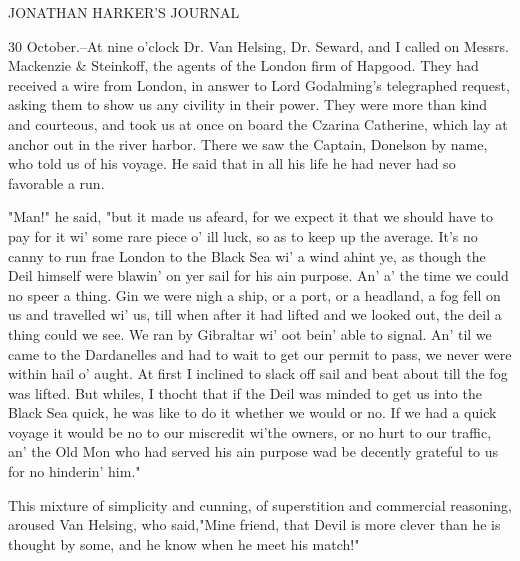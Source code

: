 JONATHAN HARKER'S JOURNAL 

30 October.--At nine o'clock Dr. Van Helsing, Dr. Seward, and I called on Messrs. Mackenzie & Steinkoff, the agents of the London firm of Hapgood. They had received a wire from London, in answer to Lord Godalming's telegraphed request, asking them to show us any civility in their power. They were more than kind and courteous, and took us at once on board the Czarina Catherine, which lay at anchor out in the river harbor. There we saw the Captain, Donelson by name, who told us of his voyage. He said that in all his life he had never had so favorable a run. 

"Man!" he said, "but it made us afeard, for we expect it that we should have to pay for it wi' some rare piece o' ill luck, so as to keep up the average. It's no canny to run frae London to the Black Sea wi' a wind ahint ye, as though the Deil himself were blawin' on yer sail for his ain purpose. An' a' the time we could no speer a thing. Gin we were nigh a ship, or a port, or a headland, a fog fell on us and travelled wi' us, till when after it had lifted and we looked out, the deil a thing could we see. We ran by Gibraltar wi' oot bein' able to signal. An' til we came to the Dardanelles and had to wait to get our permit to pass, we never were within hail o' aught. At first I inclined to slack off sail and beat about till the fog was lifted. But whiles, I thocht that if the Deil was minded to get us into the Black Sea quick, he was like to do it whether we would or no. If we had a quick voyage it would be no to our miscredit wi'the owners, or no hurt to our traffic, an' the Old Mon who had served his ain purpose wad be decently grateful to us for no hinderin' him." 

This mixture of simplicity and cunning, of superstition and commercial reasoning, aroused Van Helsing, who said,"Mine friend, that Devil is more clever than he is thought by some, and he know when he meet his match!" 

